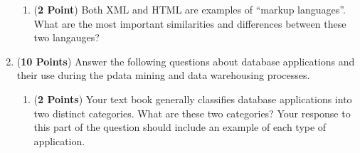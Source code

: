 \documentclass[12pt]{article}
\begin{document}
\begin{enumerate}
\begin{enumerate}
  \item ({\bf 2 Point}) Both XML and HTML are examples of ``markup languages''. What are the most important similarities
    and differences between these two langauges?

  \end{enumerate}


    





\newpage

\item ({\bf 10 Points}) Answer the following questions about database applications and their use during the pdata mining
  and data warehousing processes.

  \begin{enumerate}

  \item ({\bf 2 Points}) Your text book generally classifies database
    applications into two distinct categories.  What are these two
    categories?  Your response to this part of the question should
    include an example of each type of application.


\end{enumerate}
\end{enumerate}
\end{document}
